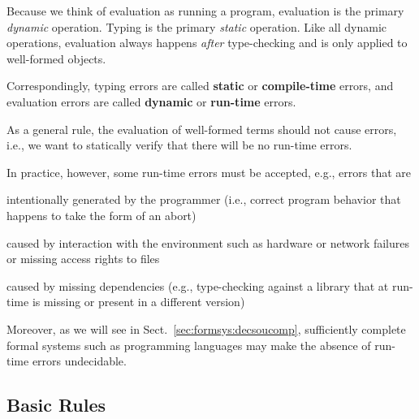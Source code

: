 Because we think of evaluation as running a program, evaluation is the primary \emph{dynamic} operation.
Typing is the primary \emph{static} operation.
Like all dynamic operations, evaluation always happens \emph{after} type-checking and is only applied to well-formed objects.

Correspondingly, typing errors are called \textbf{static} or \textbf{compile-time} errors, and evaluation errors are called \textbf{dynamic} or \textbf{run-time} errors.
\medskip

As a general rule, the evaluation of well-formed terms should not cause errors, i.e., we want to statically verify that there will be no run-time errors.

In practice, however, some run-time errors must be accepted, e.g., errors that are
\begin{compactitem}
 \item intentionally generated by the programmer (i.e., correct program behavior that happens to take the form of an abort)
 \item caused by interaction with the environment such as hardware or network failures or missing access rights to files
 \item caused by missing dependencies (e.g., type-checking against a library that at run-time is missing or present in a different version)
\end{compactitem}
Moreover, as we will see in Sect.~\ref{sec:formsys:decsoucomp}, sufficiently complete formal systems such as programming languages may make the absence of run-time errors undecidable.

\subsection{Basic Rules}

